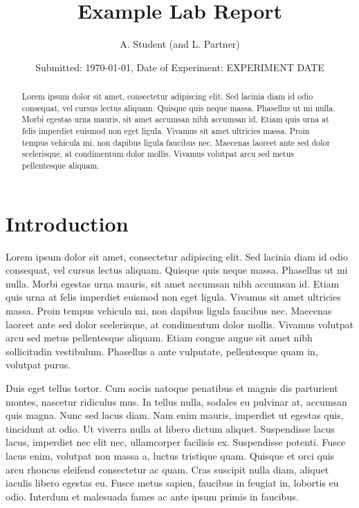 \documentclass[10pt,twocolumn]{revtex4-2}    %
\begin{document}
\title{Example Lab Report} 
\date{Submitted: \today{}, Date of Experiment: EXPERIMENT DATE}
\author{A. Student (and L. Partner)}


\begin{abstract}              
 
Lorem ipsum dolor sit amet, consectetur adipiscing elit. Sed lacinia diam id odio consequat, vel cursus lectus aliquam. Quisque quis neque massa. Phasellus ut mi nulla. Morbi egestas urna mauris, sit amet accumsan nibh accumsan id. Etiam quis urna at felis imperdiet euismod non eget ligula. Vivamus sit amet ultricies massa. Proin tempus vehicula mi, non dapibus ligula faucibus nec. Maecenas laoreet ante sed dolor scelerisque, at condimentum dolor mollis. Vivamus volutpat arcu sed metus pellentesque aliquam.

\end{abstract}

\maketitle

\thispagestyle{plain} %

\section{Introduction} 

Lorem ipsum dolor sit amet, consectetur adipiscing elit. Sed lacinia diam id odio consequat, vel cursus lectus aliquam. Quisque quis neque massa. Phasellus ut mi nulla. Morbi egestas urna mauris, sit amet accumsan nibh accumsan id. Etiam quis urna at felis imperdiet euismod non eget ligula. Vivamus sit amet ultricies massa. Proin tempus vehicula mi, non dapibus ligula faucibus nec. Maecenas laoreet ante sed dolor scelerisque, at condimentum dolor mollis. Vivamus volutpat arcu sed metus pellentesque aliquam. Etiam congue augue sit amet nibh sollicitudin vestibulum. Phasellus a ante vulputate, pellentesque quam in, volutpat purus.

Duis eget tellus tortor. Cum sociis natoque penatibus et magnis dis parturient montes, nascetur ridiculus mus. In tellus nulla, sodales eu pulvinar at, accumsan quis magna. Nunc sed lacus diam. Nam enim mauris, imperdiet ut egestas quis, tincidunt at odio. Ut viverra nulla at libero dictum aliquet. Suspendisse lacus lacus, imperdiet nec elit nec, ullamcorper facilisis ex. Suspendisse potenti. Fusce lacus enim, volutpat non massa a, luctus tristique quam. Quisque et orci quis arcu rhoncus eleifend consectetur ac quam. Cras suscipit nulla diam, aliquet iaculis libero egestas eu. Fusce metus sapien, faucibus in feugiat in, lobortis eu odio. Interdum et malesuada fames ac ante ipsum primis in faucibus.
\end{document}
